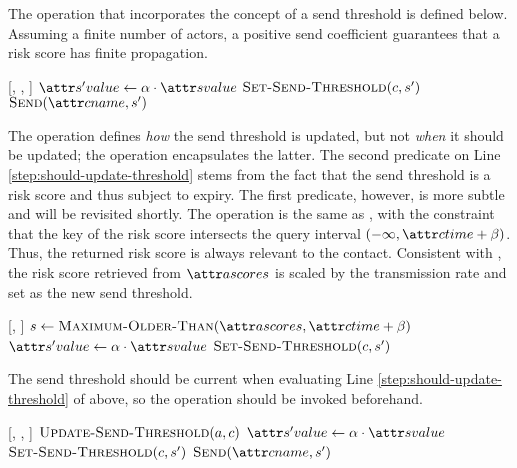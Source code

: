 The \cApplyRiskScore operation that incorporates the concept of a send threshold  is defined below. Assuming a finite number of actors, a positive send coefficient guarantees that a risk score has finite propagation.

\begin{function}{\nApplyRiskScore}[\vActor, \vContact, \vScore]
  \If{$\aContactThresholdValue < \aScoreValue \AND \aContactTime + \pTimeBuffer > \aScoreTime$}
    \State $\aNewScoreValue \assign \pTransmissionRate \cdot \aScoreValue$
    \State $\cSetSendThreshold[\vContact, \vNewScore]$
    \State $\cSend[\aContactName, \vNewScore]$
  \EndIf
\end{function}

The \cSetSendThreshold operation defines \emph{how} the send threshold is updated, but not \emph{when} it should be updated; the \cUpdateSendThreshold operation encapsulates the latter. The second predicate on Line \ref{step:should-update-threshold} stems from the fact that the send threshold is a risk score and thus subject to expiry. The first predicate, however, is more subtle and will be revisited shortly. The \cMaximumOlderThan operation is the same as \cMaximum, with the constraint that the key of the risk score intersects the query interval $(-\infty, \aContactTime + \pTimeBuffer)$. Thus, the returned risk score is always relevant to the contact. Consistent with \cApplyRiskScore, the risk score retrieved from $\aActorScores$ is scaled by the transmission rate and set as the new send threshold.

\begin{function}{\nUpdateSendThreshold}[\vActor, \vContact]
   \label{step:should-update-threshold}
    \State $\vScore \assign \cMaximumOlderThan[\aActorScores, \aContactTime + \pTimeBuffer]$
    \State $\aNewScoreValue \assign \pTransmissionRate \cdot \aScoreValue$
    \State $\cSetSendThreshold[\vContact, \vNewScore]$
  \EndIf
\end{function}

The send threshold should be current when evaluating Line \ref{step:should-update-threshold} of \cApplyRiskScore above, so the \cUpdateSendThreshold operation should be invoked beforehand.

\begin{function}{\nApplyRiskScore}[\vActor, \vContact, \vScore]
  \State $\cUpdateSendThreshold[\vActor, \vContact]$
  \If{$\aContactThresholdValue < \aScoreValue \AND \aContactTime + \pTimeBuffer > \aScoreTime$}
    \State $\aNewScoreValue \assign \pTransmissionRate \cdot \aScoreValue$
    \State $\cSetSendThreshold[\vContact, \vNewScore]$
    \State $\cSend[\aContactName, \vNewScore]$
  \EndIf
\end{function}

